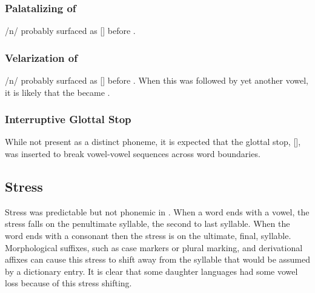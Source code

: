     \subsubsection{Palatalizing of }
    /n/ probably surfaced as [\textipa{\textltailn}] before .
    \subsubsection{Velarization of }
    /n/ probably surfaced as [] before . When this was followed by yet another vowel, it is likely that the  became . 
    \subsubsection{Interruptive Glottal Stop}
    While not present as a distinct phoneme, it is expected that the glottal stop, [], was inserted to break vowel-vowel sequences across word boundaries.
  \subsection{Stress}
  Stress was predictable but not phonemic in \langname. When a word ends with a vowel, the stress falls on the penultimate syllable, the second to last syllable. When the word ends with a consonant then the stress is on the ultimate, final, syllable. Morphological suffixes, such as case markers or plural marking, and derivational affixes can cause this stress to shift away from the syllable that would be assumed by a dictionary entry. It is clear that some daughter languages had some vowel loss because of this stress shifting.
